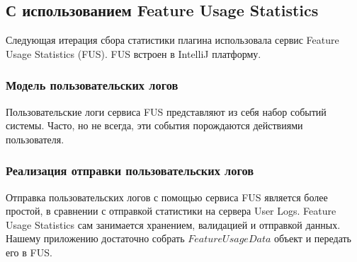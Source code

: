 \subsection{С использованием Feature Usage Statistics}\label{fus-main}
Следующая итерация сбора статистики плагина использовала сервис Feature Usage Statistics (FUS). FUS встроен в IntelliJ платформу.
\subsubsection{Модель пользовательских логов}
Пользовательские логи сервиса FUS представляют из себя набор событий системы. Часто, но не всегда, эти события порождаются действиями пользователя.
\subsubsection{Реализация отправки пользовательских логов}
Отправка пользовательских логов с помощью сервиса FUS является более простой, в сравнении с отправкой статистики на сервера User Logs. Feature Usage Statistics сам занимается хранением, валидацией и отправкой данных. Нашему приложению достаточно собрать $FeatureUsageData$ объект и передать его в FUS.
\chapterconclusion